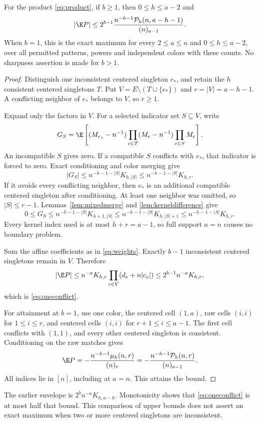 \begin{theorem}\label{thm:oneconflict}
For the product \eqref{eq:product}, if $b\ge1$, then $0\le h\le a-2$ and
\begin{equation}\label{eq:oneconflict}
|\E P|\le
2^{b-1}\frac{n^{-h-1}\mathcal P_h(n,a-h-1)}{(n)_{a-1}}.
\end{equation}
When $b=1$, this is the exact maximum for every $2\le a\le n$ and $0\le h\le a-2$, over all permitted patterns, powers and independent colors with these counts. No sharpness assertion is made for $b>1$.
\end{theorem}
\begin{proof}
Distinguish one inconsistent centered singleton $e_*$, and retain the $h$ consistent centered singletons $T$. Put $V=E\setminus(T\cup\{e_*\})$ and $r=|V|=a-h-1$. A conflicting neighbor of $e_*$ belongs to $V$, so $r\ge1$.

Expand only the factors in $V$. For a selected indicator set $S\subseteq V$, write
\[
G_S=\E\left[(M_{e_*}-n^{-1})
\prod_{e\in T}(M_e-n^{-1})\prod_{e\in S}M_e\right].
\]
An incompatible $S$ gives zero. If a compatible $S$ conflicts with $e_*$, that indicator is forced to zero. Exact conditioning and color merging give
\[
|G_S|\le n^{-h-1-|S|}K_{h,|S|}\le n^{-h-1-|S|}K_{h,r}.
\]
If it avoids every conflicting neighbor, then $e_*$ is an additional compatible centered singleton after conditioning. At least one neighbor was omitted, so $|S|\le r-1$. Lemmas~\ref{lem:mixedmerge} and \ref{lem:kerneldifference} give
\[
0\le G_S\le n^{-h-1-|S|}K_{h+1,|S|}
\le n^{-h-1-|S|}K_{h,|S|+1}
\le n^{-h-1-|S|}K_{h,r}.
\]
Every kernel index used is at most $h+r=a-1$, so full support $a=n$ causes no boundary problem.

Sum the affine coefficients as in \eqref{eq:weights}. Exactly $b-1$ inconsistent centered singletons remain in $V$. Therefore
\[
|\E P|\le n^{-a}K_{h,r}
\prod_{e\in V}(d_e+n|c_e|)
\le2^{b-1}n^{-a}K_{h,r},
\]
which is \eqref{eq:oneconflict}.

For attainment at $b=1$, use one color, the centered cell $(1,a)$, raw cells $(i,i)$ for $1\le i\le r$, and centered cells $(i,i)$ for $r+1\le i\le a-1$. The first cell conflicts with $(1,1)$, and every other centered singleton is consistent. Conditioning on the raw matches gives
\[
\E P=-\frac{n^{-h-1}\mu_h(n,r)}{(n)_r}
=-\frac{n^{-h-1}\mathcal P_h(n,r)}{(n)_{a-1}}.
\]
All indices lie in $[n]$, including at $a=n$. This attains the bound.
\end{proof}

The earlier envelope is $2^bn^{-a}K_{h,a-h}$. Monotonicity shows that \eqref{eq:oneconflict} is at most half that bound. This comparison of upper bounds does not assert an exact maximum when two or more centered singletons are inconsistent.

